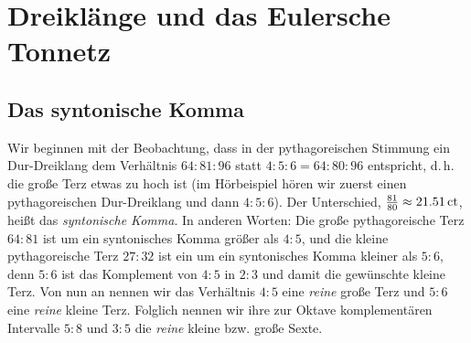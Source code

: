 \documentclass[ngerman,11pt]{scrartcl}
\begin{document}


\section{Dreiklänge und das Eulersche Tonnetz}
\label{sec:tri}

\subsection{Das syntonische Komma}

Wir beginnen mit der Beobachtung, dass in der pythagoreischen Stimmung ein
Dur-Dreiklang dem Verhältnis $64:81:96$ statt $4:5:6=64:80:96$ entspricht,
d.\,h. die große Terz etwas zu hoch ist (im Hörbeispiel hören wir zuerst einen
pythagoreischen Dur-Dreiklang und dann $4:5:6$). Der Unterschied,
$\frac{81}{80}\approx 21.51\,\mathrm{ct}$, heißt das
\emph{syntonische Komma}.
In anderen Worten: Die große pythagoreische Terz $64:81$ ist um ein syntonisches
Komma größer als $4:5$, und die kleine pythagoreische Terz $27:32$ ist ein um
ein syntonisches Komma kleiner als $5:6$, denn $5:6$ ist das Komplement von
$4:5$ in $2:3$ und damit die gewünschte kleine Terz. Von nun an nennen wir das
Verhältnis $4:5$ eine \emph{reine} große Terz und $5:6$ eine \emph{reine} kleine
Terz. Folglich nennen wir ihre zur Oktave komplementären Intervalle $5:8$ und
$3:5$ die \emph{reine} kleine bzw. große Sexte.
\end{document}
